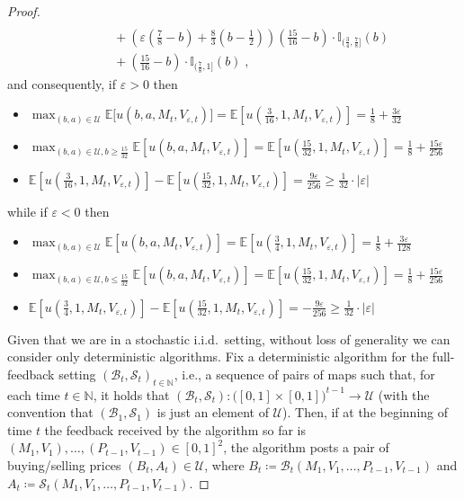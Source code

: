 \documentclass[final,12pt]{colt2025}
\newcommand{\cB}{\mathcal{B}}
\newcommand{\cS}{\mathcal{S}}
\newcommand{\cU}{\mathcal{U}}
\newcommand{\E}{\mathbb{E}}
\newcommand{\I}{\mathbb{I}}
\newcommand{\N}{\mathbb{N}}
\newcommand{\e}{\varepsilon}
\newcommand{\lrb}[1]{\left(#1\right)}
\newcommand{\brb}[1]{\bigl(#1\bigr)}
\newcommand{\lsb}[1]{\left[#1\right]}
\newcommand{\bsb}[1]{\bigl[#1\bigr]}
\newcommand{\util}{u}
\newcommand{\itemm}{\item[$\bullet$]}
\newcommand{\nP}{M}
\newcommand{\nZ}{V}
\newcommand{\nB}{B}
\newcommand{\ncB}{\cB}
\newcommand{\nb}{b}
\newcommand{\nS}{A}
\newcommand{\ncS}{\cS}
\newcommand{\ns}{a}
\begin{document}
{\begin{proof}
\begin{align*}
\\ & \qquad
    + \lrb{\e\lrb{\frac{7}{8} - \nb} + \frac{8}{3} \lrb{\nb - \frac{1}{2}}} \lrb{\frac{15}{16}-\nb} \cdot \I_{(\frac{3}{4},\frac{7}{8}]}(\nb)
\\ & \qquad
    + \lrb{\frac{15}{16}-\nb} \cdot \I_{(\frac{7}{8},1]}(\nb)\;,
\end{align*}
and consequently, if $\e > 0$ then
\begin{itemize}
    \itemm $\max_{(\nb, \ns) \in \cU} \E\bsb{\util(\nb,\ns,\nP_t, \nZ_{\e,t})} = \E\lsb{\util\lrb{\frac{3}{16},1,\nP_t, \nZ_{\e,t}}} = \frac{1}{8} + \frac{3\e}{32}$
    \itemm $\max_{(\nb, \ns) \in \cU, \nb \ge \frac{15}{32}} \E\lsb{\util(\nb,\ns,\nP_t, \nZ_{\e,t})} = \E\lsb{\util\lrb{\frac{15}{32},1,\nP_t, \nZ_{\e,t}}} = \frac{1}{8} +  \frac{15\e}{256}$
    \itemm $\E\lsb{\util\lrb{\frac{3}{16},1,\nP_t, \nZ_{\e,t}}} - \E\lsb{\util\lrb{\frac{15}{32},1,\nP_t, \nZ_{\e,t}}} = \frac{9\e}{256} \ge \frac{1}{32} \cdot |\e|$
\end{itemize}
while if $\e < 0$ then
\begin{itemize}
    \itemm $\max_{(\nb, \ns) \in \cU} \E\lsb{\util(\nb,\ns,\nP_t, \nZ_{\e,t})} = \E\lsb{\util\lrb{\frac{3}{4},1,\nP_t, \nZ_{\e,t}}} = \frac{1}{8} + \frac{3\e}{128}$
    \itemm $\max_{(\nb, \ns) \in \cU, \nb \le \frac{15}{32}} \E\lsb{\util(\nb,\ns,\nP_t, \nZ_{\e,t})} = \E\lsb{\util\lrb{\frac{15}{32},1,\nP_t, \nZ_{\e,t}}} = \frac{1}{8} +  \frac{15\e}{256}$
    \itemm $\E\lsb{\util\lrb{\frac{3}{4},1,\nP_t, \nZ_{\e,t}}} - \E\lsb{\util\lrb{\frac{15}{32},1,\nP_t, \nZ_{\e,t}}} =  -\frac{9\e}{256} \ge \frac{1}{32} \cdot |\e|$
\end{itemize}
Given that we are in a stochastic i.i.d.\ setting, without loss of generality we can consider only deterministic algorithms.
Fix a deterministic algorithm for the full-feedback setting $(\ncB_t,\ncS_t)_{t \in \N}$, i.e., a sequence of pairs of maps such that, for each time $t \in \N$, it holds that $(\ncB_t, \ncS_t) \colon \brb{[0,1] \times [0,1]}^{t-1} \to \cU$ (with the convention that $(\ncB_1,\ncS_1)$ is just an element of $\cU$). Then, if at the beginning of time $t$ the feedback received by the algorithm so far is $(\nP_1,\nZ_1),\dots,(P_{t-1},\nZ_{t-1}) \in [0,1]^2$, the algorithm posts a pair of buying/selling prices $(\nB_t,\nS_t) \in \cU$, where $\nB_t \coloneqq \ncB_t(\nP_1,\nZ_1,\dots,P_{t-1},\nZ_{t-1})$ and $\nS_t \coloneqq \ncS_t(\nP_1,\nZ_1,\dots,P_{t-1},\nZ_{t-1})$.


\end{proof}}
\end{document}
